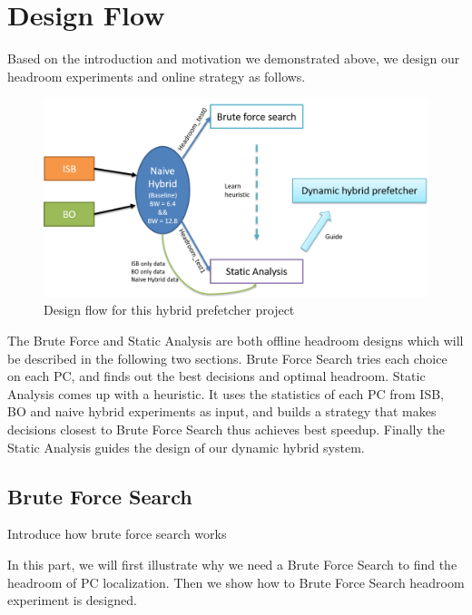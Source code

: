 \section{Design Flow}
\label{sec:designflow}

Based on the introduction and motivation we demonstrated above, we design our headroom experiments and online strategy as follows. 


\begin{figure}[ht!]
	\centering
	\includegraphics[width=1.0\textwidth]{images/design_flow.png}
	\caption{Design flow for this hybrid prefetcher project}
	\label{fig:design_flow}
\end{figure}

The Brute Force and Static Analysis are both offline headroom designs which will be described in the following two sections. Brute Force Search tries each choice on each PC, and finds out the best decisions and optimal headroom. Static Analysis comes up with a heuristic. It uses the statistics of each PC from ISB, BO and naive hybrid experiments as input, and builds a strategy that makes decisions closest to Brute Force Search thus achieves best speedup. Finally the Static Analysis guides the design of our dynamic hybrid system.


  \subsection{Brute Force Search}
  \label{sec:bruteforcesearch}
  
  Introduce how brute force search works \par
  In this part, we will first illustrate why we need a Brute Force Search to find the headroom of PC localization. Then we show how to Brute Force Search headroom experiment is designed. \par
  
